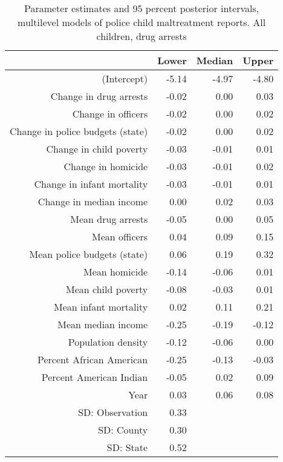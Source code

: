 \begin{table}[ht]
\centering
\begin{tabular}{rrrr}
  \hline
 & Lower & Median & Upper \\ 
  \hline
(Intercept) & -5.14 & -4.97 & -4.80 \\ 
  Change in drug arrests & -0.02 & 0.00 & 0.03 \\ 
  Change in officers & -0.02 & 0.00 & 0.02 \\ 
  Change in police budgets (state) & -0.02 & 0.00 & 0.02 \\ 
  Change in child poverty & -0.03 & -0.01 & 0.01 \\ 
  Change in homicide & -0.03 & -0.01 & 0.02 \\ 
  Change in infant mortality & -0.03 & -0.01 & 0.01 \\ 
  Change in median income & 0.00 & 0.02 & 0.03 \\ 
  Mean drug arrests & -0.05 & 0.00 & 0.05 \\ 
  Mean officers & 0.04 & 0.09 & 0.15 \\ 
  Mean police budgets (state) & 0.06 & 0.19 & 0.32 \\ 
  Mean homicide & -0.14 & -0.06 & 0.01 \\ 
  Mean child poverty & -0.08 & -0.03 & 0.01 \\ 
  Mean infant mortality & 0.02 & 0.11 & 0.21 \\ 
  Mean median income & -0.25 & -0.19 & -0.12 \\ 
  Population density & -0.12 & -0.06 & 0.00 \\ 
  Percent African American & -0.25 & -0.13 & -0.03 \\ 
  Percent American Indian & -0.05 & 0.02 & 0.09 \\ 
  Year & 0.03 & 0.06 & 0.08 \\ 
  SD: Observation & 0.33 &  &  \\ 
  SD: County & 0.30 &  &  \\ 
  SD: State & 0.52 &  &  \\ 
   \hline
\end{tabular}
\caption{Parameter estimates and 95 percent posterior intervals, multilevel models of 
             police child maltreatment reports. All children, drug arrests} 
\end{table}
